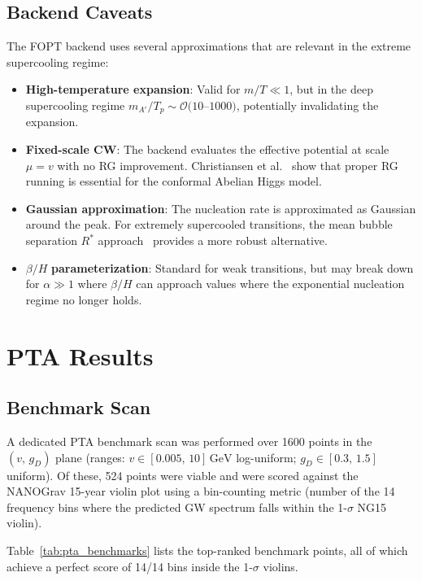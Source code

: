 \documentclass[a4paper,11pt]{article}
\newcommand{\GeV}{\,\text{GeV}}
\begin{document}
\subsection{Backend Caveats}

The FOPT backend uses several approximations that are relevant in the extreme supercooling regime:
\begin{itemize}
\item \textbf{High-temperature expansion}: Valid for $m/T \ll 1$, but in the deep supercooling regime $m_{A'}/T_p \sim \mathcal{O}(10$--$1000)$, potentially invalidating the expansion.
\item \textbf{Fixed-scale CW}: The backend evaluates the effective potential at scale $\mu = v$ with no RG improvement. Christiansen et al.~\cite{christiansen2025} show that proper RG running is essential for the conformal Abelian Higgs model.
\item \textbf{Gaussian approximation}: The nucleation rate is approximated as Gaussian around the peak. For extremely supercooled transitions, the mean bubble separation $R^*$ approach~\cite{costa2025,li2026} provides a more robust alternative.
\item $\beta/H$ \textbf{parameterization}: Standard for weak transitions, but may break down for $\alpha \gg 1$ where $\beta/H$ can approach values where the exponential nucleation regime no longer holds.
\end{itemize}

\section{PTA Results}

\subsection{Benchmark Scan}

A dedicated PTA benchmark scan was performed over 1600 points in the $(v,\,g_D)$ plane (ranges: $v \in [0.005,\,10]\GeV$ log-uniform; $g_D \in [0.3,\,1.5]$ uniform). Of these, 524 points were viable and were scored against the NANOGrav 15-year violin plot using a bin-counting metric (number of the 14 frequency bins where the predicted GW spectrum falls within the 1-$\sigma$ NG15 violin).

Table~\ref{tab:pta_benchmarks} lists the top-ranked benchmark points, all of which achieve a perfect score of 14/14 bins inside the 1-$\sigma$ violins.
\end{document}
